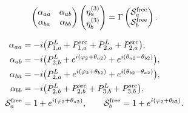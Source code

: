 \begin{equation}
\begin{pmatrix}
\alpha_{aa} & \alpha_{ab}\\
\alpha_{ba} & \alpha_{bb}
\end{pmatrix}
\begin{pmatrix}
\eta_a^{(3)}\\
\eta_b^{(3)}
\end{pmatrix}
=
\Gamma
\begin{pmatrix}
\mathcal{S}_a^{\rm free}\\
\mathcal{S}_b^{\rm free}
\end{pmatrix}.
\end{equation}

\begin{align}
\alpha_{aa} &= -i\bigl(P_{1,a}^{L}+P_{1,a}^{\rm src}+P_{2,a}^{L}+P_{2,a}^{\rm src}\bigr),\\
\alpha_{ab} &= -i\bigl(P_{2,b}^{L}+e^{i(\varphi_2+\theta_{a2})}+e^{i(\theta_{a2}-\theta_{b2})}\bigr),\\
\alpha_{ba} &= -i\bigl(P_{2,a}^{L}+e^{i(\varphi_2+\theta_{b2})}+e^{i(\theta_{b2}-\theta_{a2})}\bigr),\\
\alpha_{bb} &= -i\bigl(P_{2,b}^{L}+P_{2,b}^{\rm src}+P_{3,b}^{L}+P_{3,b}^{\rm src}\bigr),\\
\mathcal{S}_a^{\rm free} &= 1+e^{i(\varphi_2+\theta_{a2})},\qquad
\mathcal{S}_b^{\rm free} = 1+e^{i(\varphi_2+\theta_{b2})}.
\end{align}
